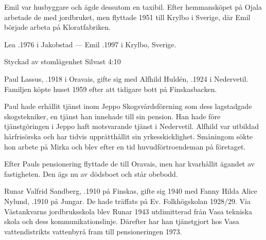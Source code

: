 Emil var husbyggare och ägde dessutom en taxibil. Efter hemmansköpet på Ojala arbetade de med jordbruket, men flyttade 1951 till Krylbo i Sverige, där Emil började arbeta på Kloratfabriken.

Lea .1976 i Jakobstad  ---  Emil .1997 i Krylbo, Sverige.




Styckad av stomlägenhet Silvast 4:10


Paul Lassus, .1918 i Oravais, gifte sig med Alfhild Huldén, .1924 i Nedervetil. Familjen köpte huset 1959 efter att tidigare bott på Finskasbacken.

Paul hade erhållit tjänst inom Jeppo Skogsvårdsförening som dess lagstadgade skogstekniker, en tjänst han innehade till sin pension. Han hade före tjänstgöringen i Jeppo haft motsvarande tjänst i Nedervetil. Alfhild var utbildad hårfrisörska och har tidvis upprätthållit sin yrkesskicklighet. Småningom sökte hon arbete på Mirka och blev efter en tid huvudförtroendeman på företaget.

Efter Pauls pensionering flyttade de till Oravais, men har kvarhållit ägandet av fastigheten. Den ägs nu av dödsboet och står obebodd.
\begin{jhchildren}
  \item {}
  \item {}
  \item {}
  \item {}
\end{jhchildren}


Runar Valfrid Sandberg, .1910 på Finskas, gifte sig 1940 med Fanny Hilda Alice Nylund, .1910 på Jungar. De hade träffats på Ev. Folkhögskolan 1928/29. Via Västankvarns jordbruksskola blev Runar 1943 utdimitterad från Vasa tekniska skola och dess kommunikationslinje. Därefter har han tjänstgjort hos Vasa vattendistrikts vattenbyrå fram till pensioneringen 1973.

